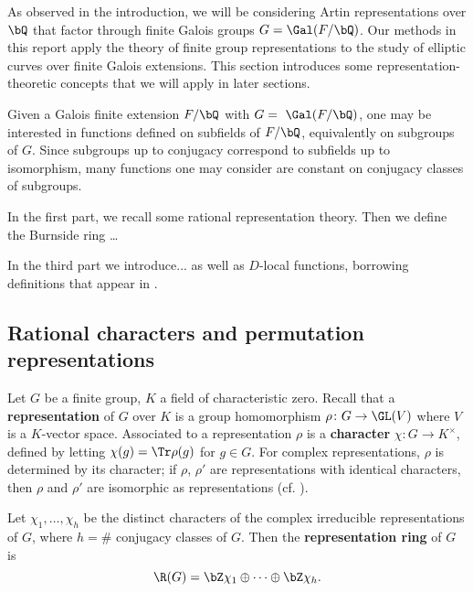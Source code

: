 As observed in the introduction, we will be considering Artin representations over $\bQ$ that factor through finite Galois groups $G = \Gal(F / \bQ)$. Our methods in this report apply the theory of finite group representations to the study of elliptic curves over finite Galois extensions. This section introduces some representation-theoretic concepts that we will apply in later sections. 



Given a Galois finite extension $F / \bQ$ with $G = \ \Gal(F / \bQ)$, one may be interested in functions defined on subfields of $F / \bQ$, equivalently on subgroups of $G$. Since subgroups up to conjugacy correspond to subfields up to isomorphism, many functions one may consider are constant on conjugacy classes of subgroups. 

In the first part, we recall some rational representation theory. Then we define the Burnside ring{\color{red} \ldots}

In the third part we introduce... as well as $D$-local functions, borrowing definitions that appear in \cite[Section 2.iii]{reg-const}.

\subsection{Rational characters and permutation representations}\label{rep}

Let $G$ be a finite group, $K$ a field of characteristic zero. Recall that a \textbf{representation} of $G$ over $K$ is a group homomorphism $\rho \colon G \to \GL(V)$ where $V$ is a $K$-vector space. Associated to a representation $\rho$ is a \textbf{character} $\chi \colon G \to K^{\times}$, defined by letting $\chi(g) = \Tr \rho(g)$ for $g \in G$. For complex representations, $\rho$ is determined by its character; if $\rho$, $\rho'$ are representations with identical characters, then $\rho$ and $\rho'$ are isomorphic as representations (cf. \cite[Chapter 2, \S 2.3]{Serre}). 

\begin{defn}\label{rep-ring}
Let $\chi_1, \ldots,  \chi_h$ be the distinct characters of the complex irreducible representations of $G$, where $h = \#$ conjugacy classes of $G$. 
Then the \textbf{representation ring} of $G$ is 
\[ \R(G) = \bZ \chi_1 \oplus \cdots \oplus \bZ \chi_h .\]
\end{defn}

